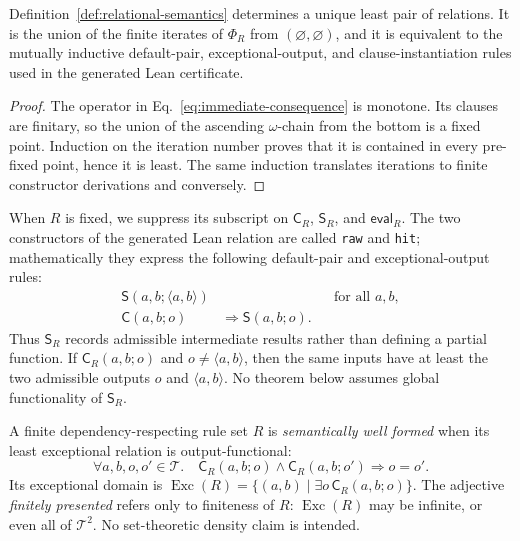 \documentclass[runningheads]{llncs}
\newcommand{\Tree}{\mathcal{T}}
\newcommand{\Code}{\mathsf{C}}
\newcommand{\Step}{\mathsf{S}}
\newcommand{\evalop}{\mathsf{eval}}
\newcommand{\pair}[2]{\langle #1,#2\rangle}
\begin{document}
\begin{proposition}
\label{prop:least-semantics}
Definition~\ref{def:relational-semantics} determines a unique least pair of
relations.  It is the union of the finite iterates of \(\Phi_R\) from
\((\varnothing,\varnothing)\), and it is equivalent to the mutually inductive
default-pair, exceptional-output, and clause-instantiation rules used in the
generated Lean certificate.
\end{proposition}

\begin{proof}
The operator in Eq.~\eqref{eq:immediate-consequence} is monotone.  Its clauses
are finitary, so the union of the ascending \(\omega\)-chain from the bottom is
a fixed point.  Induction on the iteration number proves that it is contained
in every pre-fixed point, hence it is least.  The same induction translates
iterations to finite constructor derivations and conversely.
\end{proof}

When $R$ is fixed, we suppress its subscript on \(\Code_R\), \(\Step_R\),
and \(\evalop_R\).  The two constructors of the generated Lean relation are
called \texttt{raw} and \texttt{hit}; mathematically they express the following
default-pair and exceptional-output rules:
\begin{align}
  \Step(a,b;\pair{a}{b}) & &&\text{for all }a,b, \label{eq:raw-step}\\
  \Code(a,b;o) &\Longrightarrow \Step(a,b;o). \label{eq:hit-step}
\end{align}
Thus $\Step_R$ records admissible intermediate results rather than defining a
partial function.  If \(\Code_R(a,b;o)\) and
\(o\ne\pair{a}{b}\), then the same inputs have at least the two admissible
outputs $o$ and \(\pair{a}{b}\).  No theorem below assumes global
functionality of \(\Step_R\).

\begin{definition}
\label{def:well-formed-presentation}
A finite dependency-respecting rule set $R$ is \emph{semantically
well formed} when its least exceptional relation is output-functional:
\[
 \forall a,b,o,o'\in\Tree.\quad
 \Code_R(a,b;o)\land\Code_R(a,b;o')\Longrightarrow o=o'.
\]
Its exceptional domain is
\(\operatorname{Exc}(R)=\{(a,b)\mid\exists o\,\Code_R(a,b;o)\}\).
The adjective \emph{finitely presented} refers only to finiteness of $R$:
\(\operatorname{Exc}(R)\) may be infinite, or even all of \(\Tree^2\).  No
set-theoretic density claim is intended.
\end{definition}
\end{document}
